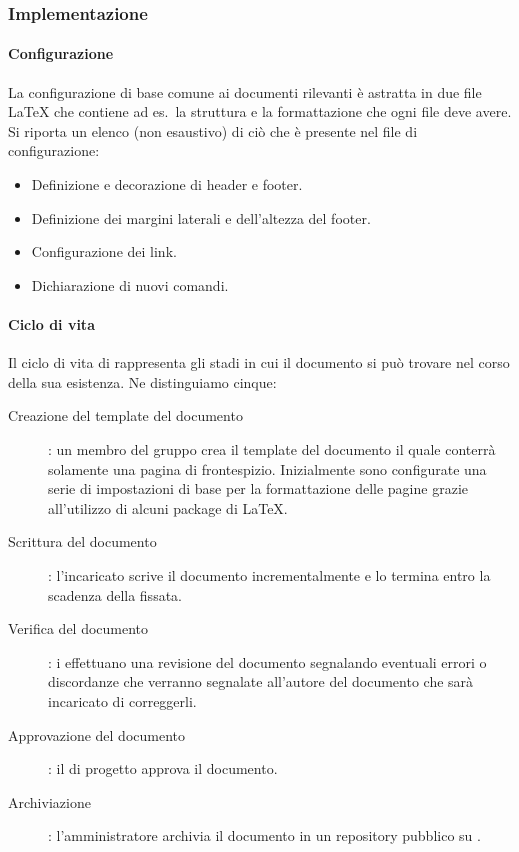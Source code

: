 \documentclass[../norme-di-progetto.tex]{subfiles}
\begin{document}
\subsubsection{Implementazione}%
\label{subs:implementazione}

\paragraph{Configurazione}%
\label{par:configurazione}
La configurazione di base comune ai documenti rilevanti è astratta in due file \LaTeX{} che contiene ad es.\ la struttura e la formattazione che ogni file deve avere.
Si riporta un elenco (non esaustivo) di ciò che è presente nel file di configurazione:

\begin{itemize}
  \item Definizione e decorazione di header e footer.
  \item Definizione dei margini laterali e dell'altezza del footer.
  \item Configurazione dei link.
  \item Dichiarazione di nuovi comandi.
\end{itemize}

\paragraph{Ciclo di vita}%
\label{par:ciclo_di_vita}
Il ciclo di vita di rappresenta gli stadi in cui il documento si può trovare nel corso della sua esistenza. Ne distinguiamo cinque:

\begin{description}
  \item [Creazione del template del documento]: un membro del gruppo crea il template del documento il quale conterrà solamente una pagina di frontespizio. Inizialmente sono configurate una serie di impostazioni di base per la formattazione delle pagine grazie all'utilizzo di alcuni package di \LaTeX.
  \item [Scrittura del documento]: l'incaricato scrive il documento incrementalmente e lo termina entro la scadenza della  fissata.
  \item [Verifica del documento]: i  effettuano una revisione del documento segnalando eventuali errori o discordanze che verranno segnalate all'autore del documento che sarà incaricato di correggerli.
  \item [Approvazione del documento]: il  di progetto approva il documento.
  \item [Archiviazione]: l'amministratore archivia il documento in un repository pubblico su .
\end{description}
\end{document}
